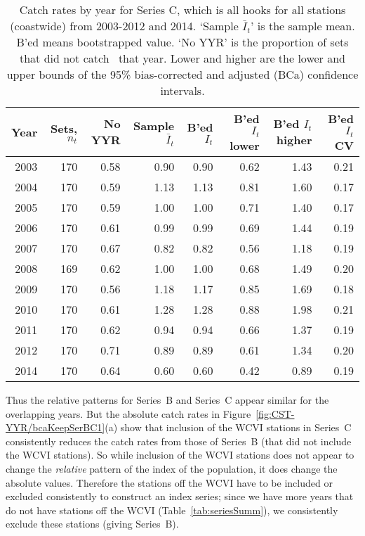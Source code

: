 \begin{table}[bp]    %
\centering
\caption{Catch rates by year for Series C, which is all hooks for 
      all stations (coastwide) from 2003-2012 and 2014.
     `Sample $\bar{I}_t$' is the sample mean. B'ed means bootstrapped 
     value. `No YYR' is the proportion of sets that did not catch \spName~that
     year. Lower and higher are the 
     lower and upper bounds of the 95\% bias-corrected and adjusted (BCa)
     confidence intervals.} 
\label{tab:bcaKeepSerC}
\begin{tabular}{rrrrrrrr}
  \hline
Year & Sets, $n_t$ & No YYR & Sample $\bar{I}_t$ & B'ed $I_t$ & B'ed $I_t$ lower & B'ed $I_t$ higher & B'ed $I_t$ CV \\ 
  \hline
2003 & 170 & 0.58 & 0.90 & 0.90 & 0.62 & 1.43 & 0.21 \\ 
  2004 & 170 & 0.59 & 1.13 & 1.13 & 0.81 & 1.60 & 0.17 \\ 
  2005 & 170 & 0.59 & 1.00 & 1.00 & 0.71 & 1.40 & 0.17 \\ 
  2006 & 170 & 0.61 & 0.99 & 0.99 & 0.69 & 1.44 & 0.19 \\ 
  2007 & 170 & 0.67 & 0.82 & 0.82 & 0.56 & 1.18 & 0.19 \\ 
  2008 & 169 & 0.62 & 1.00 & 1.00 & 0.68 & 1.49 & 0.20 \\ 
  2009 & 170 & 0.56 & 1.18 & 1.17 & 0.85 & 1.69 & 0.18 \\ 
  2010 & 170 & 0.61 & 1.28 & 1.28 & 0.88 & 1.98 & 0.21 \\ 
  2011 & 170 & 0.62 & 0.94 & 0.94 & 0.66 & 1.37 & 0.19 \\ 
  2012 & 170 & 0.71 & 0.89 & 0.89 & 0.61 & 1.34 & 0.20 \\ 
  2014 & 170 & 0.64 & 0.60 & 0.60 & 0.42 & 0.89 & 0.19 \\ 
   \hline
\end{tabular}
\end{table}%


Thus the relative patterns for Series~B and Series~C appear similar for the
overlapping years. But the absolute catch rates in
Figure~\ref{fig:CST-YYR/bcaKeepSerBC1}(a) show that inclusion of the WCVI
stations in Series~C consistently reduces the catch rates from those of Series~B
(that did not include the WCVI stations). So while inclusion of the WCVI
stations does not appear to change the \emph{relative} pattern of the index of
the population, it does change the absolute values. Therefore the stations off
the WCVI have to be included or excluded consistently to construct an index
series; since we have more years that do not have stations off the WCVI
(Table~\ref{tab:seriesSumm}), we consistently exclude these stations (giving
Series~B).

